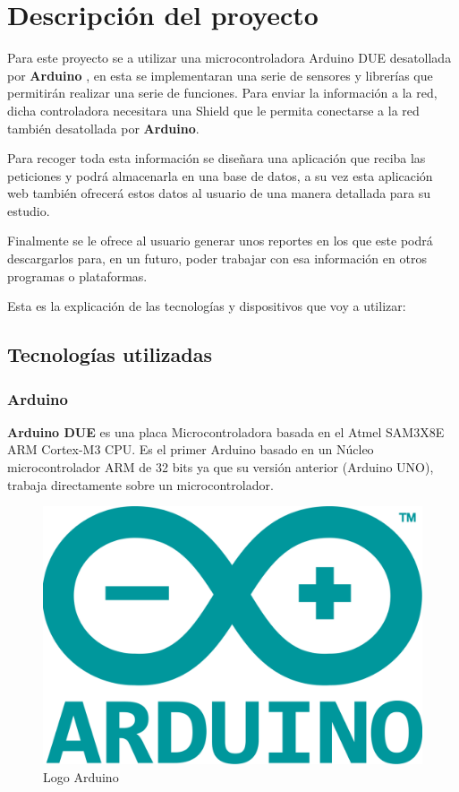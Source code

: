 \chapter{Descripción del proyecto}

\setlength{\parindent}{5ex}Para este proyecto se a utilizar una microcontroladora Arduino DUE desatollada por \textbf{Arduino} , en esta se implementaran una serie de sensores y librerías que permitirán realizar una serie de funciones. Para enviar la información a la red, dicha controladora necesitara una Shield que le permita conectarse a la red también desatollada por \textbf{Arduino}.

\setlength{\parindent}{0ex}Para recoger toda esta información se diseñara una aplicación que reciba las peticiones y podrá almacenarla en una base de datos, a su vez esta aplicación web también ofrecerá estos datos al usuario de una manera detallada para su estudio.

Finalmente se le ofrece al usuario generar unos reportes en los que este podrá descargarlos para, en un futuro, poder trabajar con esa información en otros programas o plataformas.

Esta es la explicación de las tecnologías y dispositivos que voy a utilizar:

\section{Tecnologías utilizadas}

\subsection{Arduino}

\setlength{\parindent}{5ex}\textbf{Arduino DUE }es una placa Microcontroladora basada en el Atmel SAM3X8E ARM Cortex-M3 CPU. Es el primer Arduino basado en un Núcleo microcontrolador ARM de 32 bits ya que su versión anterior (Arduino UNO), trabaja directamente sobre un microcontrolador.

\begin{figure}[!h]
	\centering
	\includegraphics[width=0.2\linewidth]{figuras/ardulogo}
	\caption{Logo Arduino}
	\label{fig:ardulogo}
\end{figure}

